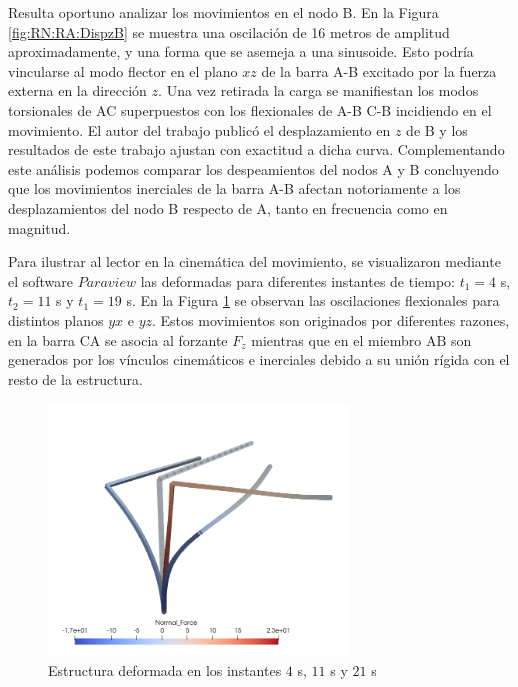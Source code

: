 Resulta oportuno analizar los movimientos en el nodo B. En la Figura \ref{fig:RN:RA:DispzB} se muestra una oscilación de 16 metros de amplitud aproximadamente, y una forma que se asemeja a una sinusoide. Esto podría vincularse al modo flector en el plano $xz$ de la barra A-B excitado por la fuerza externa en la dirección $z$. Una vez retirada la carga se manifiestan los modos torsionales de AC superpuestos con los flexionales de A-B C-B incidiendo en el movimiento. El autor del trabajo \textcite{Le2014} publicó el desplazamiento en $z$ de B y los resultados de este trabajo ajustan con exactitud a dicha curva. Complementando este análisis podemos comparar los despeamientos del nodos A y B concluyendo que los movimientos inerciales de la barra A-B afectan notoriamente a los desplazamientos del nodo B respecto de A, tanto en frecuencia como en magnitud. 



Para ilustrar al lector en la cinemática del movimiento, se visualizaron mediante el software $\textit{Paraview}$ las deformadas para diferentes instantes de tiempo: $t_1=4$ s, $t_2=11$ s y $t_1=19$ s. En la Figura \ref{fig:RN:RA:Deformadas} se observan las oscilaciones flexionales para distintos planos $yx$ e $yz$. Estos movimientos son originados por diferentes razones, en la barra $\text{CA}$ se asocia al forzante $F_z$ mientras que en el miembro $\text{AB}$ son generados por los vínculos cinemáticos e inerciales debido a su unión rígida con el resto de la estructura.

\begin{figure}[htbp]
	\centering
	\includegraphics[width=80mm]{./imagenes/ResultadosNumericos/RightAngeCantilever/Deformadas.png}
	\caption{Estructura deformada en los instantes $4$ s, $11$ s y $21$ s}
	\label{fig:RN:RA:Deformadas}
\end{figure}

